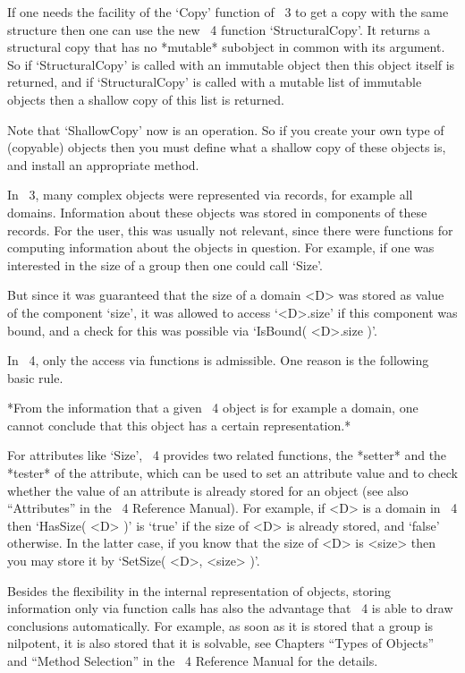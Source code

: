 If one needs the facility of the `Copy' function of {\GAP}~3 to get a
copy with the same structure then one can use the new {\GAP}~4
function `StructuralCopy'.  It returns a structural copy that has no
*mutable* subobject in common with its argument.  So if
`StructuralCopy' is called with an immutable object then this object
itself is returned, and if `StructuralCopy' is called with a mutable
list of immutable objects then a shallow copy of this list is
returned.

Note that `ShallowCopy' now is an operation.  So if you create your
own type of (copyable) objects then you must define what a shallow
copy of these objects is, and install an appropriate method.



In {\GAP}~3, many complex objects were represented via records, for
example all domains.  Information about these objects was stored in
components of these records.  For the user, this was usually not
relevant, since there were functions for computing information about
the objects in question.  For example, if one was interested in the
size of a group then one could call `Size'.

But since it was guaranteed that the size of a domain <D> was stored
as value of the component `size', it was allowed to access `<D>.size'
if this component was bound, and a check for this was possible via
`IsBound( <D>.size )'.

In {\GAP}~4, only the access via functions is admissible.  One reason
is the following basic rule.

*From the information that a given {\GAP}~4 object is for example a
domain, one cannot conclude that this object has a certain
representation.*

For attributes like `Size', {\GAP}~4 provides two related functions,
the *setter* and the *tester* of the attribute, which can be used to
set an attribute value and to check whether the value of an attribute
is already stored for an object (see also ``Attributes'' in the {\GAP}~4
Reference Manual).  For example, if <D> is a domain in {\GAP}~4 then
`HasSize( <D> )' is `true' if the size of <D> is already stored, and
`false' otherwise.  In the latter case, if you know that the size of
<D> is <size> then you may store it by `SetSize( <D>, <size> )'.

Besides the flexibility in the internal representation of objects,
storing information only via function calls has also the advantage
that {\GAP}~4 is able to draw conclusions automatically.  For example,
as soon as it is stored that a group is nilpotent, it is also stored
that it is solvable, see Chapters ``Types of Objects'' and 
``Method Selection'' in the {\GAP}~4 Reference Manual for the details.

